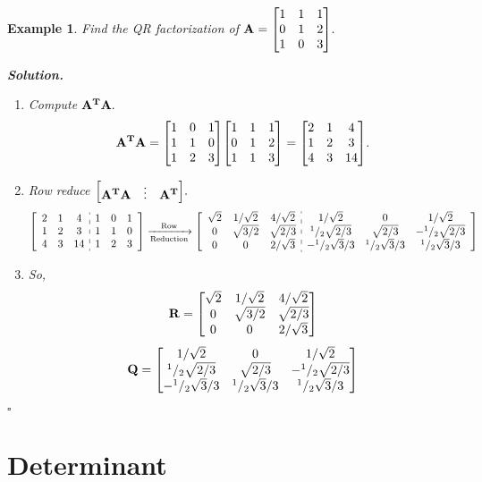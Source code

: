 \documentclass[12pt, a4paper]{article}
\newtheorem{eg}{Example}[subsection]
\newenvironment*{sol}{\par\indent\textbf{\textit{Solution. }}}{\hfill{$\square$}\par}
\def\T{{\vb{T}}}
\def\matrixA{\vb{A}}
\begin{document}
\begin{eg}
	Find the QR factorization of $\matrixA=\mqty[{1&1&1\\0&1&2\\1&0&3}].$
	\begin{sol}
		\begin{enumerate}
			\item Compute $\matrixA^\T\matrixA.$\[\matrixA^\T\matrixA=\mqty[{1&0&1\\1&1&0\\1&2&3}]\mqty[{1&1&1\\0&1&2\\1&1&3}]=\mqty[{2&1&4\\1&2&3\\4&3&14}].\]
			\item Row reduce $\mqty[{\matrixA^\T\matrixA&\vdots&\matrixA^\T}].$ \[\left[\begin{array}{c:c}\mqty{2&1&4\\1&2&3\\4&3&14}&\mqty{1&0&1\\1&1&0\\1&2&3}\end{array}\right]\xrightarrow[\text{Reduction}]{\text{Row}}\left[\begin{array}{c:c}\mqty{\sqrt{2}&1/\sqrt{2}&4/\sqrt{2}\\0&\sqrt{3/2}&\sqrt{2/3}\\0&0&2/\sqrt{3}}&\mqty{1/\sqrt{2}&0&1/\sqrt{2}\\^1/_2\sqrt{2/3}&\sqrt{2/3}&-^1/_2\sqrt{2/3}\\-^1/_2\sqrt{3}/3&^1/_2\sqrt{3}/3&^1/_2\sqrt{3}/3}\end{array}\right]\]
			\item So, \[\vb R=\mqty[{\sqrt{2}&1/\sqrt{2}&4/\sqrt{2}\\0&\sqrt{3/2}&\sqrt{2/3}\\0&0&2/\sqrt{3}}]\]\[\vb Q=\mqty[{1/\sqrt{2}&0&1/\sqrt{2}\\^1/_2\sqrt{2/3}&\sqrt{2/3}&-^1/_2\sqrt{2/3}\\-^1/_2\sqrt{3}/3&^1/_2\sqrt{3}/3&^1/_2\sqrt{3}/3}]\]
		\end{enumerate}
	\end{sol}
\end{eg}


\newpage
\section{Determinant}
\end{document}
